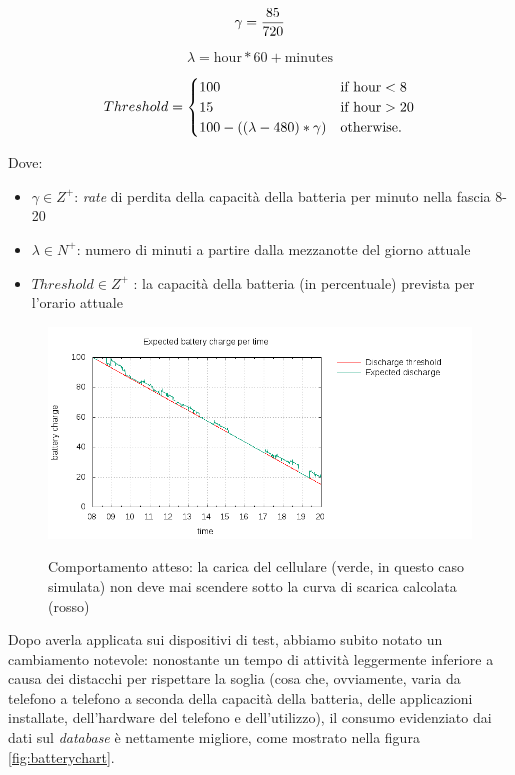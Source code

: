 \documentclass[a4paper,10pt]{memoir}
\begin{document}
\begin{equation}
\gamma = {85 \over 720}
\end{equation}

\begin{equation}
\lambda = \text{hour} * 60 + \text{minutes}
\end{equation}

\begin{equation}
	\\
    Threshold =
    \begin{cases}
        100 & \text{if hour} < 8\\
        15 & \text{if hour} > 20\\
        {100 - ((\lambda - 480) * \gamma)} & \text{otherwise.}
    \end{cases}
\end{equation}

Dove:
\begin{itemize}
\item $\gamma \in Z^+$: \textit{rate} di perdita della capacità della batteria per minuto nella fascia 8-20
\item $\lambda \in N^+$: numero di minuti a partire dalla mezzanotte del giorno attuale
\item $Threshold \in Z^+$ : la capacità della batteria (in percentuale) prevista per l'orario attuale
\end{itemize}

\begin{figure}[ht]
\centering
\caption{Comportamento atteso: la carica del cellulare (verde, in questo caso simulata) non deve mai scendere sotto la curva di scarica calcolata (rosso)}
\includegraphics[width=\textwidth]{database/expectedplot}
\label{fig:expectedchart}
\end{figure}

Dopo averla applicata sui dispositivi di test, abbiamo subito notato un cambiamento notevole: nonostante un tempo di attività leggermente inferiore a causa dei distacchi per rispettare la soglia (cosa che, ovviamente, varia da telefono a telefono a seconda della capacità della batteria, delle applicazioni installate, dell'hardware del telefono e dell'utilizzo), il consumo evidenziato dai dati sul \textit{database} è nettamente migliore, come mostrato nella figura \ref{fig:batterychart}.
\end{document}
